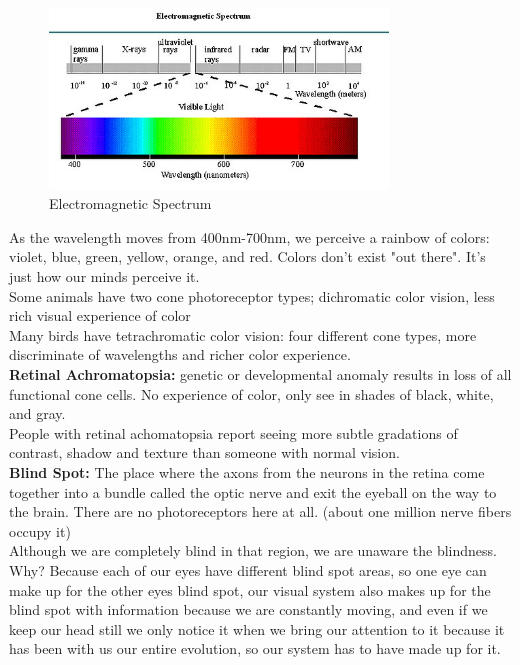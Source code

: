 \documentclass{article}
\begin{document}
\begin{figure}[htp]
\centering
\includegraphics[width=9cm]{images/electro2.jpg}
\caption{Electromagnetic Spectrum}
\label{fig: Electro Spectrum}
\end{figure}

As the wavelength moves from 400nm-700nm, we perceive a rainbow of colors: violet, blue, green, yellow, orange, and red. Colors don't exist "out there". It's just how our minds perceive it. \\
\indent Some animals have two cone photoreceptor types; dichromatic color vision, less rich visual experience of color \\
\indent Many birds have tetrachromatic color vision: four different cone types, more discriminate of wavelengths and richer color experience. \\

\textbf{Retinal Achromatopsia:} genetic or developmental anomaly results in loss of all functional cone cells. No experience of color, only see in shades of black, white, and gray. \\
People with retinal achomatopsia report seeing more subtle gradations of contrast, shadow and texture than someone with normal vision. \\

\textbf{Blind Spot:} The place where the axons from the neurons in the retina come together into a bundle called the optic nerve and exit the eyeball on the way to the brain. There are no photoreceptors here at all. (about one million nerve fibers occupy it)\\
Although we are completely blind in that region, we are unaware the blindness. Why? Because each of our eyes have different blind spot areas, so one eye can make up for the other eyes blind spot, our visual system also makes up for the blind spot with information because we are constantly moving, and even if we keep our head still we only notice it when we bring our attention to it because it has been with us our entire evolution, so our system has to have made up for it. \\
\end{document}
